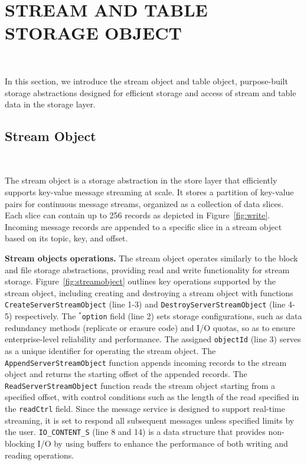 \section{STREAM AND TABLE STORAGE OBJECT}~\label{sec:datagen}

In this section, we introduce the stream object and table object, purpose-built storage abstractions designed for efficient storage and access of stream and table data in the storage layer.


\subsection{Stream Object}~\label{subsec:streamobject}

The stream object is a storage abstraction in the store layer that efficiently supports key-value message streaming at scale. It stores a partition of key-value pairs for continuous message streams, organized as a collection of data slices. Each slice can contain up to 256 records as depicted in Figure~\ref{fig:write}. Incoming message records are appended  to a specific slice in a stream object based on its topic, key, and offset.

\noindent \textbf{Stream objects operations.} The stream object operates similarly to the block and file storage abstractions, providing read and write functionality for stream storage. Figure~\ref{fig:streamobject} outlines key operations supported by the stream object, including creating and destroying a stream object with  functions \texttt{CreateServerStreamObject} (line 1-3) and \texttt{DestroyServerStreamObject} (line 4-5) respectively. The \texttt{$^*$option} field (line 2) sets storage configurations, such as data redundancy methods (replicate or erasure code) and I/O quotas, so as to ensure enterprise-level reliability and performance. The assigned \texttt{objectId} (line 3) serves as a unique identifier for operating the stream object. The \texttt{AppendServerStreamObject} function appends incoming records  to the stream object and returns the starting offset of the appended records. The \texttt{ReadServerStreamObject} function reads the stream object starting from a specified offset, with control conditions such as the length of the read specified in the \texttt{readCtrl} field. 
Since the message service is designed to support real-time streaming, it is set to respond  all subsequent messages unless specified  limits by the user.
\texttt{IO\_CONTENT\_S} (line 8 and 14) is a data structure that provides non-blocking I/O by using buffers to enhance the performance of both writing and reading operations.


